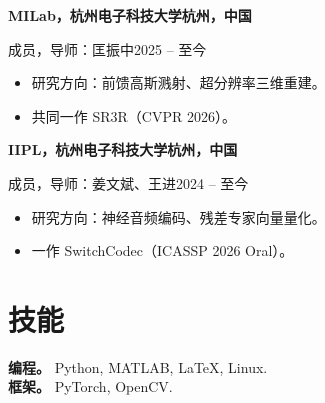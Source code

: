 \documentclass[10pt,a4paper]{article}
\newcommand{\entry}[4]{%
  \par\vspace{1pt}%
  \noindent\textbf{#1}\hfill\textbf{#2}\par
  {\small #3\hfill #4}\par
}
\begin{document}
\vspace{3pt}
\entry{MILab，杭州电子科技大学}{杭州，中国}
{成员，导师：匡振中}{2025 -- 至今}
\begin{itemize}
  \item 研究方向：前馈高斯溅射、超分辨率三维重建。
  \item 共同一作 SR3R（CVPR 2026）。
\end{itemize}

\vspace{3pt}
\entry{IIPL，杭州电子科技大学}{杭州，中国}
{成员，导师：姜文斌、王进}{2024 -- 至今}
\begin{itemize}
  \item 研究方向：神经音频编码、残差专家向量量化。
  \item 一作 SwitchCodec（ICASSP 2026 Oral）。
\end{itemize}

\section{技能}

\noindent\textbf{编程。} Python, MATLAB, \LaTeX, Linux.\\
\textbf{框架。} PyTorch, OpenCV.
\end{document}
